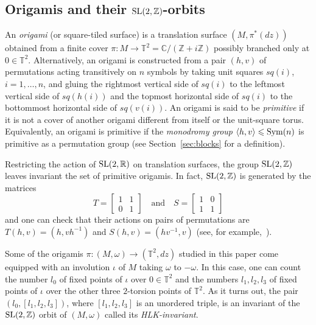 \documentclass[a4paper,11pt]{amsart}
\numberwithin{equation}{section}
\numberwithin{figure}{section}
\numberwithin{table}{section}
\newcommand{\Z}{\mathbb{Z}}
\newcommand{\R}{\mathbb{R}}
\DeclareMathOperator{\SL}{{\rm{SL}}}
\DeclareMathOperator{\Sym}{{\rm{Sym}}}
\begin{document}

\subsection{Origamis and their ${\SL(2,\Z)}$-orbits} An \textit{origami} (or square-tiled surface) is a translation surface $(M,\pi^*(dz))$ obtained from a finite cover $\pi:M\to \mathbb{T}^2=\mathbb{C}/(\mathbb{Z}+i\mathbb{Z})$ possibly branched only at $0\in\mathbb{T}^2$. Alternatively, an origami is constructed from a pair $(h,v)$ of permutations acting transitively on $n$ symbols by taking unit squares $sq(i)$, $i=1,\dots,n$, and gluing the rightmost vertical side of $sq(i)$ to the leftmost vertical side of $sq(h(i))$ and the topmost horizontal side of $sq(i)$ to the bottommost horizontal side of $sq(v(i))$. An origami is said to be \textit{primitive} if it is not a cover of another origami different from itself or the unit-square torus. Equivalently, an origami is primitive if the \textit{monodromy group} $\langle h, v\rangle\leqslant\Sym(n)$ is primitive as a permutation group (see Section~\ref{sec:blocks} for a definition).

Restricting the action of $\SL(2,\R)$ on translation surfaces, the group $\SL(2,\mathbb{Z})$ leaves invariant the set of primitive origamis. In fact, $\SL(2,\mathbb{Z})$ is generated by the matrices 
\[T = \begin{bmatrix}
    1 & 1 \\
    0 & 1
\end{bmatrix} \quad \textrm{and} \quad 
S = \begin{bmatrix}
    1 & 0 \\
    1 & 1
\end{bmatrix}\] and one can check that their actions on pairs of permutations are $T(h,v)=(h,vh^{-1})$ and $S(h,v)=(hv^{-1},v)$ (see, for example,~\cite[Figure 2.2]{JM}).

Some of the origamis $\pi:(M,\omega)\to(\mathbb{T}^2,dz)$ studied in this paper come equipped with an involution $\iota$ of $M$ taking $\omega$ to $-\omega$. In this case, one can count the number $l_0$ of fixed points of $\iota$ over $0\in\mathbb{T}^2$ and the numbers $l_1, l_2, l_3$ of fixed points of $\iota$ over the other three $2$-torsion points of $\mathbb{T}^2$. As it turns out, the pair $(l_0,[l_1,l_2,l_3])$, where $[l_1,l_2,l_3]$ is an unordered triple, is an invariant of the $\SL(2,\mathbb{Z})$ orbit of $(M,\omega)$ called its \textit{HLK-invariant}.  
\end{document}
